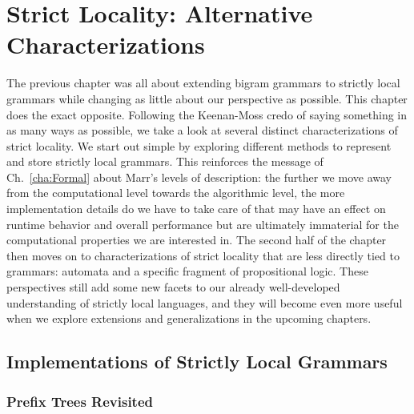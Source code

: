 \chapter{Strict Locality: Alternative Characterizations}
\label{cha:SLImplement}

The previous chapter was all about extending bigram grammars to strictly local grammars while changing as little about our perspective as possible.
This chapter does the exact opposite.
Following the Keenan-Moss credo of saying something in as many ways as possible, we take a look at several distinct characterizations of strict locality.
We start out simple by exploring different methods to represent and store strictly local grammars.
This reinforces the message of Ch.~\ref{cha:Formal} about Marr's levels of description: the further we move away from the computational level towards the algorithmic level, the more implementation details do we have to take care of that may have an effect on runtime behavior and overall performance but are ultimately immaterial for the computational properties we are interested in.
The second half of the chapter then moves on to characterizations of strict locality that are less directly tied to grammars: automata and a specific fragment of propositional logic. 
These perspectives still add some new facets to our already well-developed understanding of strictly local languages, and they will become even more useful when we explore extensions and generalizations in the upcoming chapters.

\section{Implementations of Strictly Local Grammars}

\subsection{Prefix Trees Revisited}

